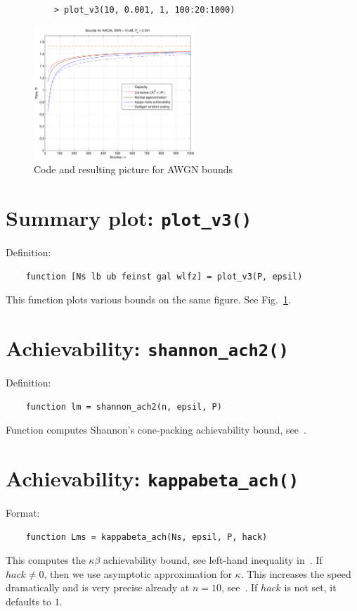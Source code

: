 \documentclass[a4paper,11p]{memoir}
\begin{document}
\begin{figure}
\centering
\begin{verbatim}
	> plot_v3(10, 0.001, 1, 100:20:1000)
\end{verbatim}
\includegraphics[height=5cm]{plots/awgn_plot3_ex}
\caption{Code and resulting picture for AWGN bounds}\label{fig:awgn_example}
\end{figure}


\section{Summary plot: \texttt{plot\_v3()}}

Definition:
\begin{verbatim}
	function [Ns lb ub feinst gal wlfz] = plot_v3(P, epsil)
\end{verbatim}

This function plots various bounds on the same figure. See Fig.~\ref{fig:awgn_example}.


\section{Achievability: \texttt{shannon\_ach2()}}

Definition:
\begin{verbatim}
	function lm = shannon_ach2(n, epsil, P)
\end{verbatim}

Function computes Shannon's cone-packing achievability bound, see~\cite[(41)]{PPV08}.

\section{Achievability: \texttt{kappabeta\_ach()}}
Format:
\begin{verbatim}
	function Lms = kappabeta_ach(Ns, epsil, P, hack)
\end{verbatim}

This computes the $\kappa\beta$ achievability bound, see left-hand inequality in~\cite[(218)]{PPV08}. If $hack\neq 0$, then we
use asymptotic approximation for $\kappa$. This increases the speed dramatically and is very precise already at $n=10$,
see~\cite[(217)]{PPV08}. If $hack$ is not set, it defaults to $1$.
\end{document}
